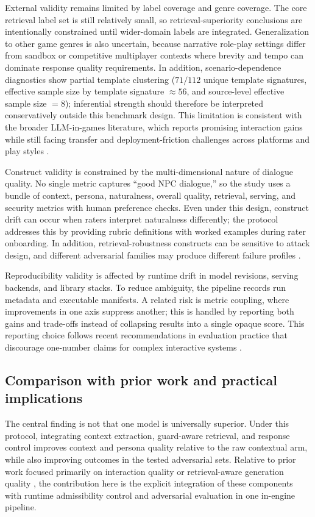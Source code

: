 ﻿\documentclass[a4paper,12pt]{article}
\begin{document}
External validity remains limited by label coverage and genre coverage. The core retrieval label set is still relatively small, so retrieval-superiority conclusions are intentionally constrained until wider-domain labels are integrated. Generalization to other game genres is also uncertain, because narrative role-play settings differ from sandbox or competitive multiplayer contexts where brevity and tempo can dominate response quality requirements. In addition, scenario-dependence diagnostics show partial template clustering (\(71/112\) unique template signatures, effective sample size by template signature \(\approx 56\), and source-level effective sample size \(=8\)); inferential strength should therefore be interpreted conservatively outside this benchmark design. This limitation is consistent with the broader LLM-in-games literature, which reports promising interaction gains while still facing transfer and deployment-friction challenges across platforms and play styles \cite{Gallotta2024Survey,Sweetser2024Scoping,Rao2024Minecraft}.

Construct validity is constrained by the multi-dimensional nature of dialogue quality. No single metric captures ``good NPC dialogue,'' so the study uses a bundle of context, persona, naturalness, overall quality, retrieval, serving, and security metrics with human preference checks. Even under this design, construct drift can occur when raters interpret naturalness differently; the protocol addresses this by providing rubric definitions with worked examples during rater onboarding. In addition, retrieval-robustness constructs can be sensitive to attack design, and different adversarial families may produce different failure profiles \cite{Zou2025PoisonedRAG,Chaturvedi2025AIP}.

Reproducibility validity is affected by runtime drift in model revisions, serving backends, and library stacks. To reduce ambiguity, the pipeline records run metadata and executable manifests. A related risk is metric coupling, where improvements in one axis suppress another; this is handled by reporting both gains and trade-offs instead of collapsing results into a single opaque score. This reporting choice follows recent recommendations in evaluation practice that discourage one-number claims for complex interactive systems \cite{Liang2023HELM,Wang2024Judge,Dubois2024AlpacaEval}.

\subsection{Comparison with prior work and practical implications}
The central finding is not that one model is universally superior. Under this protocol, integrating context extraction, guard-aware retrieval, and response control improves context and persona quality relative to the raw contextual arm, while also improving outcomes in the tested adversarial sets. Relative to prior work focused primarily on interaction quality \cite{Park2023GenerativeAgents} or retrieval-aware generation quality \cite{Asai2024SelfRAG,Edge2024GraphRAG}, the contribution here is the explicit integration of these components with runtime admissibility control and adversarial evaluation in one in-engine pipeline.
\end{document}
